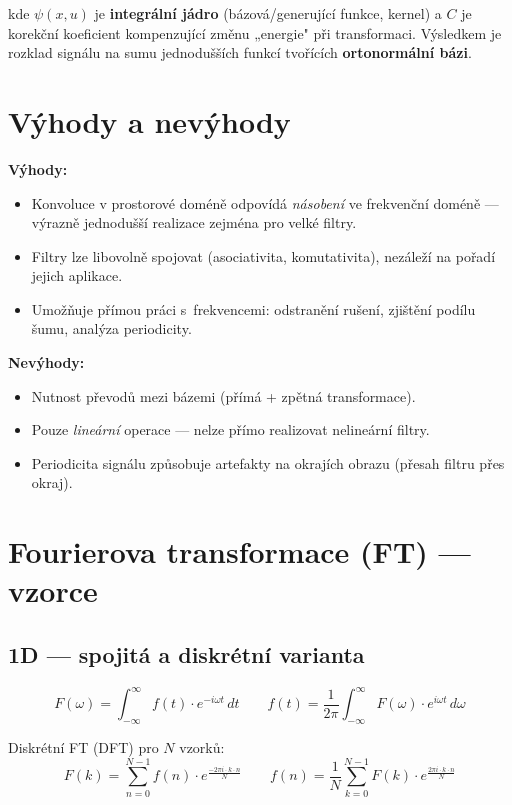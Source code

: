 kde $\psi(x,u)$ je \textbf{integrální jádro} (bázová/generující funkce, kernel) a $C$ je korekční koeficient kompenzující změnu „energie" při transformaci. Výsledkem je rozklad signálu na sumu jednodušších funkcí tvořících \textbf{ortonormální bázi}.
 
\section*{Výhody a nevýhody}
 
\textbf{Výhody:}
\begin{itemize}
  \item Konvoluce v prostorové doméně odpovídá \emph{násobení} ve frekvenční doméně — výrazně jednodušší realizace zejména pro velké filtry.
  \item Filtry lze libovolně spojovat (asociativita, komutativita), nezáleží na pořadí jejich aplikace.
  \item Umožňuje přímou práci s~frekvencemi: odstranění rušení, zjištění podílu šumu, analýza periodicity.
\end{itemize}
 
\textbf{Nevýhody:}
\begin{itemize}
  \item Nutnost převodů mezi bázemi (přímá + zpětná transformace).
  \item Pouze \emph{lineární} operace — nelze přímo realizovat nelineární filtry.
  \item Periodicita signálu způsobuje artefakty na okrajích obrazu (přesah filtru přes okraj).
\end{itemize}
 
\section*{Fourierova transformace (FT) — vzorce}
 
\subsection*{1D — spojitá a diskrétní varianta}
 
\[
  F(\omega) = \int_{-\infty}^{\infty} f(t)\cdot e^{-i\omega t}\,dt
  \qquad
  f(t) = \frac{1}{2\pi}\int_{-\infty}^{\infty} F(\omega)\cdot e^{i\omega t}\,d\omega
\]
 
Diskrétní FT (DFT) pro $N$ vzorků:
\[
  F(k) = \sum_{n=0}^{N-1} f(n)\cdot e^{\frac{-2\pi i \cdot k \cdot n}{N}}
  \qquad
  f(n) = \frac{1}{N}\sum_{k=0}^{N-1} F(k)\cdot e^{\frac{2\pi i \cdot k \cdot n}{N}}
\]
 
